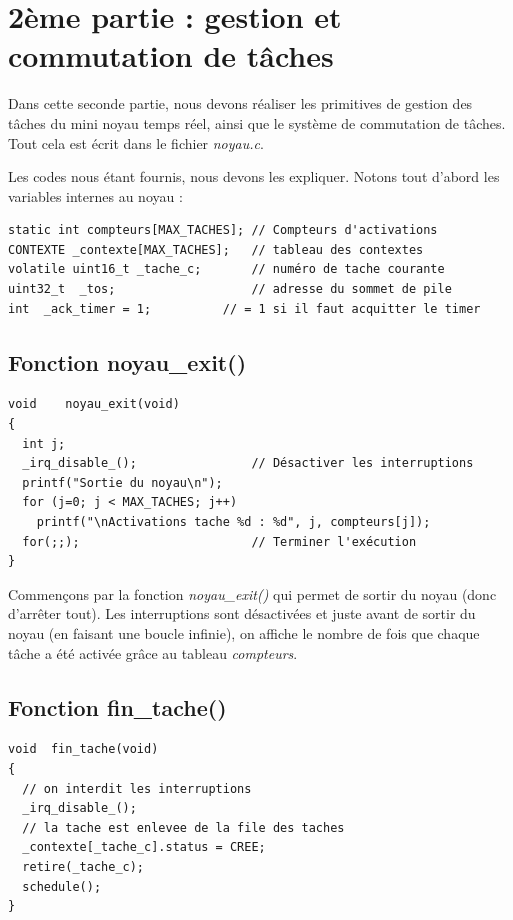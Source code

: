 \documentclass[a4paper,12pt]{report}
\begin{document}
\newpage
\section{2ème partie : gestion et commutation de tâches}
Dans cette seconde partie, nous devons réaliser  les  primitives de  gestion  des  tâches  du  mini  noyau  temps réel, ainsi que le système de commutation de tâches. Tout cela est écrit dans le fichier \textit{noyau.c}.

Les codes nous étant fournis, nous devons les expliquer. Notons tout d'abord les variables internes au noyau :

\begin{lstlisting}
static int compteurs[MAX_TACHES]; // Compteurs d'activations 
CONTEXTE _contexte[MAX_TACHES];   // tableau des contextes 
volatile uint16_t _tache_c;       // numéro de tache courante 
uint32_t  _tos;                   // adresse du sommet de pile 
int  _ack_timer = 1;          // = 1 si il faut acquitter le timer 
\end{lstlisting}



\subsection{Fonction noyau\_exit()}
\begin{lstlisting}
void	noyau_exit(void)
{
  int j;
  _irq_disable_();                // Désactiver les interruptions 
  printf("Sortie du noyau\n");
  for (j=0; j < MAX_TACHES; j++)
    printf("\nActivations tache %d : %d", j, compteurs[j]);
  for(;;);                        // Terminer l'exécution 
}
\end{lstlisting}

Commençons par la fonction \textit{noyau\_exit()} qui permet de sortir du noyau (donc d'arrêter tout).
Les interruptions sont désactivées et juste avant de sortir du noyau (en faisant une boucle infinie), on affiche le nombre de fois que chaque tâche a été activée grâce au tableau \textit{compteurs}.

\subsection{Fonction fin\_tache()}
\begin{lstlisting}
void  fin_tache(void)
{
  // on interdit les interruptions
  _irq_disable_();
  // la tache est enlevee de la file des taches
  _contexte[_tache_c].status = CREE;
  retire(_tache_c);
  schedule();
}
\end{lstlisting}
\end{document}
